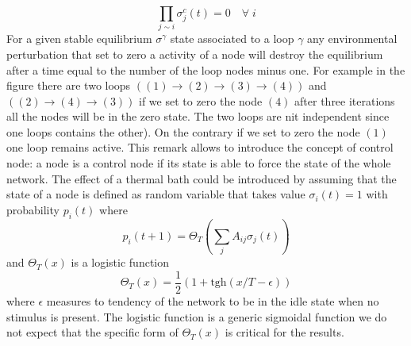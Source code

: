 $$
\prod_{j\sim i} \sigma^c_j(t)=0 \quad \forall \; i
$$
For a given stable equilibrium $\sigma^\gamma$ state associated to a loop $\gamma$ any environmental perturbation
that set to zero a activity of a node will destroy the equilibrium after a time equal to the number of the loop nodes minus one.
For example in the figure there are two loops $((1)\to (2)\to (3)\to (4))$ and $((2)\to(4)\to (3))$ if we set to zero the node 
$(4)$ after three iterations all the nodes will be in the zero state. The two loops are nit independent since one loops contains the other). On the contrary if we set to zero the node $(1)$ one loop remains active. This remark allows to introduce the concept of control node: a node is a control node if its state is able to 
force the state of the whole network. The effect of a thermal bath could be introduced by assuming that the state of a node
is defined as random variable that takes value $\sigma_i(t)=1$ with probability $p_i(t)$ where 
\begin{equation}
p_i(t+1)=\Theta_T\left (\sum_j A_{ij}\sigma_j(t)\right )
\label{stocdyn}
\end{equation}
and $\Theta_T(x)$ is a logistic function 
$$
\Theta_T(x)=\frac{1}{2}\left (1+\textrm{tgh}(x/T-\epsilon)\right )
$$
where $\epsilon$ measures to tendency of the network to be in the idle state when no stimulus is present.
The logistic function is a generic sigmoidal function we do not expect that the specific form of $\Theta_T(x)$ is critical for the results.
\par\noindent



